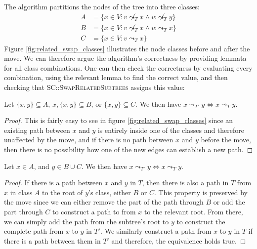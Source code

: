 The algorithm partitions the nodes of the tree into three classes:
\begin{align*}
    A &= \{x \in V: v \not\leadsto_T x \wedge w \not\leadsto_T y\} \\
    B &= \{x \in V: v \not\leadsto_T x \wedge w \leadsto_T x\} \\
    C &= \{x \in V: v \leadsto_T x\}
\end{align*}
Figure \ref{fig:related_swap_classes} illustrates the node classes before and after the move. We can therefore argue the algorithm's correctness by providing lemmata for all class combinations. One can then check the correctness by evaluating every combination, using the relevant lemma to find the correct value, and then checking that \textsc{SC::SwapRelatedSubtrees} assigns this value:

\begin{lemma}
    \label{lem:related_swap_equal}
    Let $\{x, y\} \subseteq A$, $x, \{x, y\} \subseteq B$, or $\{x, y\} \subseteq C$. We then have $x \leadsto_{T'} y \Leftrightarrow x \leadsto_T y$.
\end{lemma}

\begin{proof}
    This is fairly easy to see in figure \ref{fig:related_swap_classes} since an existing path between $x$ and $y$ is entirely inside one of the classes and therefore unaffected by the move, and if there is no path between $x$ and $y$ before the move, then there is no possibility how one of the new edges can establish a new path.
\end{proof}

\begin{lemma}
    \label{lem:related_swap_abc}
    Let $x \in A$, and $y \in B \cup C$. We then have $x \leadsto_{T'} y \Leftrightarrow x \leadsto_T y$.
\end{lemma}

\begin{proof}
    If there is a path between $x$ and $y$ in $T$, then there is also a path in $T$ from $x$ in class $A$ to the root of $y$'s class, either $B$ or $C$. This property is preserved by the move since we can either remove the part of the path through $B$ or add the part through $C$ to construct a path to from $x$ to the relevant root. From there, we can simply add the path from the subtree's root to $y$ to construct the complete path from $x$ to $y$ in $T'$. We similarly construct a path from $x$ to $y$ in $T$ if there is a path between them in $T'$ and therefore, the equivalence holds true.
\end{proof}

